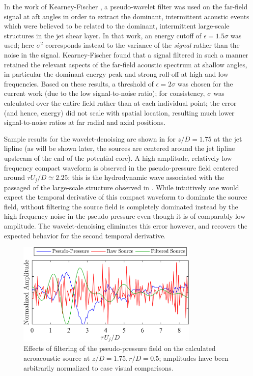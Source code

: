 In the work of Kearney-Fischer \etal \cite{Kearney-Fischer2013}, a pseudo-wavelet filter was used on the far-field signal at aft angles in order to extract the dominant, intermittent acoustic events which were believed to be related to the dominant, intermittent large-scale structures in the jet shear layer. 
In that work, an energy cutoff of $\epsilon = 1.5\sigma$ was used; here $\sigma^2$ corresponds instead to the variance of the \textit{signal} rather than the noise in the signal. 
Kearney-Fischer \etal found that a signal filtered in such a manner retained the relevant aspects of the far-field acoustic spectrum at shallow angles, in particular the dominant energy peak and strong roll-off at high and low frequencies.
Based on these results, a threshold of $\epsilon = 2\sigma$ was chosen for the current work (due to the low signal-to-noise ratio); for consistency, $\sigma$ was calculated over the entire field rather than at each individual point; the error (and hence, energy) did not scale with spatial location, resulting much lower signal-to-noise ratios at far radial and axial positions. 

Sample results for the wavelet-denoising are shown in  for $z/D=1.75$ at the jet lipline (as will be shown later, the sources are centered around the jet lipline upstream of the end of the potential core).
A high-amplitude, relatively low-frequency compact waveform is observed in the pseudo-pressure field centered around $\tau U_j /D \simeq 2.25$; this is the hydrodynamic wave associated with the passaged of the large-scale structure observed in .
While intuitively one would expect the temporal derivative of this compact waveform to dominate the source field, without filtering the source field is completely dominated instead by the high-frequency noise in the pseudo-pressure even though it is of comparably low amplitude.
The wavelet-denoising eliminates this error however, and recovers the expected behavior for the second temporal derivative.
\begin{figure}
	\centering
	\includegraphics[width = 3.5in]{Figures/ch5_valid_denoising.png}
	\caption{Effects of filtering of the pseudo-pressure field on the calculated aeroacoustic source at $z/D = 1.75, r/D = 0.5$; amplitudes have been arbitrarily normalized to ease visual comparisons.}
	\label{fig:valid_denoising}
\end{figure}


